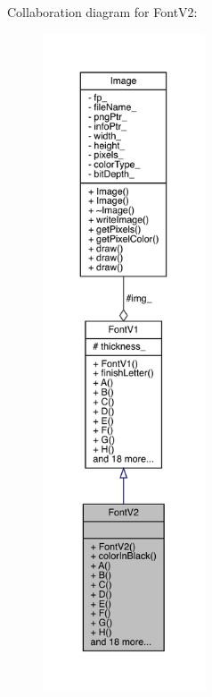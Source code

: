 Collaboration diagram for Font\+V2\+:
\nopagebreak
\begin{figure}[H]
\begin{center}
\leavevmode
\includegraphics[height=550pt]{class_font_v2__coll__graph}
\end{center}
\end{figure}
